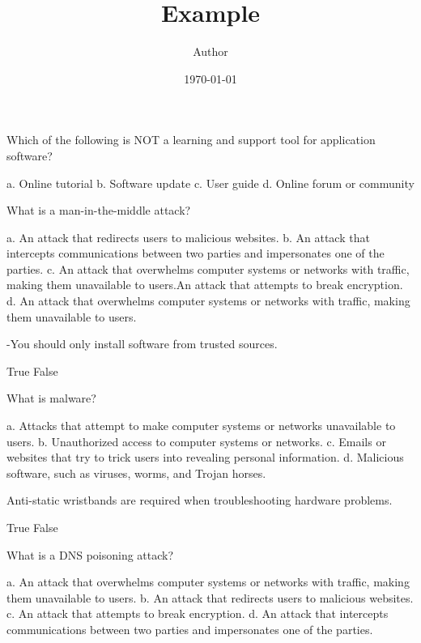 \documentclass{exam}
\title{Example}
\author{Author}
\date{\today}
\begin{document}
\maketitle

\begin{questions}

\printanswers

\question Which of the following is NOT a learning and support tool for application software?
\begin{checkboxes}
\choice a. Online tutorial
\CorrectChoice b. Software update
\choice c. User guide
\choice d. Online forum or community
\end{checkboxes}

\question What is a man-in-the-middle attack?
\begin{checkboxes}
\choice a. An attack that redirects users to malicious websites.
\CorrectChoice b. An attack that intercepts communications between two parties and impersonates one of the parties.
\choice c. An attack that overwhelms computer systems or networks with traffic, making them unavailable to users.An attack that attempts to break encryption.
\choice d. An attack that overwhelms computer systems or networks with traffic, making them unavailable to users.
\end{checkboxes}

-You should only install software from trusted sources.
\begin{checkboxes}
\CorrectChoice True
\choice False
\end{checkboxes}

\question What is malware?
\begin{checkboxes}
\choice a. Attacks that attempt to make computer systems or networks unavailable to users.
\choice b. Unauthorized access to computer systems or networks.
\choice c. Emails or websites that try to trick users into revealing personal information.
\CorrectChoice d. Malicious software, such as viruses, worms, and Trojan horses.
\end{checkboxes}

\question Anti-static wristbands are required when troubleshooting hardware problems.
\begin{checkboxes}
\choice True
\CorrectChoice False
\end{checkboxes}

\question What is a DNS poisoning attack?
\begin{checkboxes}
\choice a. An attack that overwhelms computer systems or networks with traffic, making them unavailable to users.
\CorrectChoice b. An attack that redirects users to malicious websites.
\choice c. An attack that attempts to break encryption.
\choice d. An attack that intercepts communications between two parties and impersonates one of the parties.
\end{checkboxes}


\end{questions}
\end{document}
